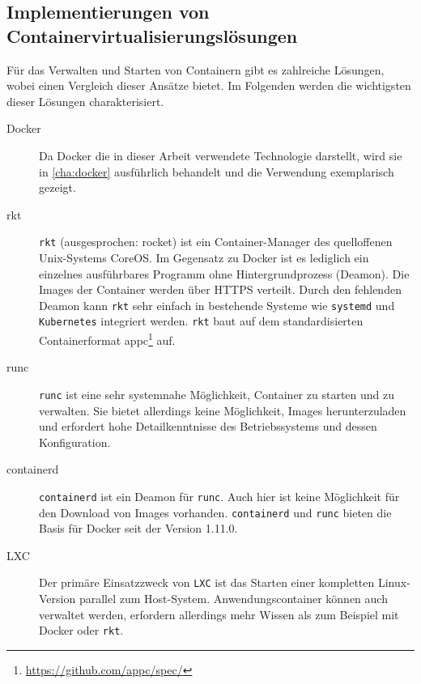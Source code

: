 
\subsection{Implementierungen von Containervirtualisierungslösungen}
\label{sec:container-solutions}
Für das Verwalten und Starten von Containern gibt es zahlreiche Lösungen, wobei \autocite{rkt-comparison:online} einen Vergleich dieser Ansätze bietet.
Im Folgenden werden die wichtigsten dieser Lösungen charakterisiert.
\begin{description}
    \item [Docker] Da Docker die in dieser Arbeit verwendete Technologie darstellt, wird sie in \cref{cha:docker} ausführlich behandelt und die Verwendung exemplarisch gezeigt.
    \item [rkt] \texttt{rkt} (ausgesprochen: rocket) ist ein Container-Manager des quelloffenen Unix-Systems CoreOS. Im Gegensatz zu Docker ist es lediglich ein einzelnes ausführbares Programm ohne Hintergrundprozess (Deamon).
    Die Images der Container werden über HTTPS verteilt. Durch den fehlenden Deamon kann \texttt{rkt} sehr einfach in bestehende Systeme wie \texttt{systemd} und \texttt{Kubernetes} integriert werden. \texttt{rkt} baut auf dem standardisierten Containerformat appc\footnote{\url{https://github.com/appc/spec/}} auf.
    \item [runc] \texttt{runc} ist eine sehr systemnahe Möglichkeit, Container zu starten und zu verwalten. Sie bietet allerdings keine Möglichkeit, Images herunterzuladen und erfordert hohe Detailkenntnisse des Betriebssystems und dessen Konfiguration.
    \item [containerd] \texttt{containerd} ist ein Deamon für \texttt{runc}. Auch hier ist keine Möglichkeit für den Download von Images vorhanden. \texttt{containerd} und \texttt{runc} bieten die Basis für Docker seit der Version 1.11.0.
    \item [LXC] Der primäre Einsatzzweck von \texttt{LXC} ist das Starten einer kompletten Linux-Version parallel zum Host-System. Anwendungscontainer können auch verwaltet werden, erfordern allerdings mehr Wissen als zum Beispiel mit Docker oder \texttt{rkt}.
\end{description}

